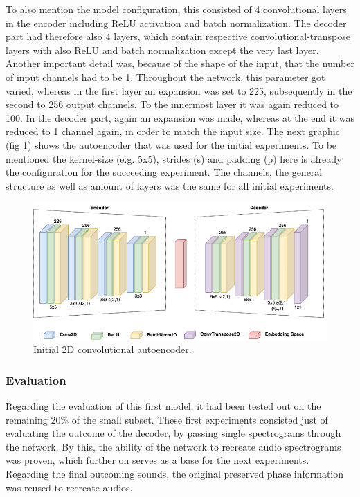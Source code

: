 To also mention the model configuration, this consisted of 4 convolutional layers in the encoder including ReLU activation and batch normalization. The decoder part had therefore also 4 layers, which contain respective convolutional-transpose layers with also ReLU and batch normalization except the very last layer. Another important detail was, because of the shape of the input, that the number of input channels had to be 1. Throughout the network, this parameter got varied, whereas in the first layer an expansion was set to 225, subsequently in the second to 256 output channels. To the innermost layer it was again reduced to 100. In the decoder part, again an expansion was made, whereas at the end it was reduced to 1 channel again, in order to match the input size. The next graphic (fig \ref{fig:cae_2D_init}) shows the autoencoder that was used for the initial experiments. To be mentioned the kernel-size (e.g. 5x5), strides (s) and padding (p) here is already the configuration for the succeeding experiment. The channels, the general structure as well as amount of layers was the same for all initial experiments.

 \begin{figure}[htb!]
	\caption{Initial 2D convolutional autoencoder.}
	\label{fig:cae_2D_init}
	\centering
	\includegraphics[width=\textwidth]{images/experiments/autoencoder_init.png}
\end{figure}

\subsubsection{Evaluation}
Regarding the evaluation of this first model, it had been tested out on the remaining 20\% of the small subset. These first experiments consisted just of evaluating the outcome of the decoder, by passing single spectrograms through the network. By this, the ability of the network to recreate audio spectrograms was proven, which further on serves as a base for the next experiments. Regarding the final outcoming sounds, the original preserved phase information was reused to recreate audios.


